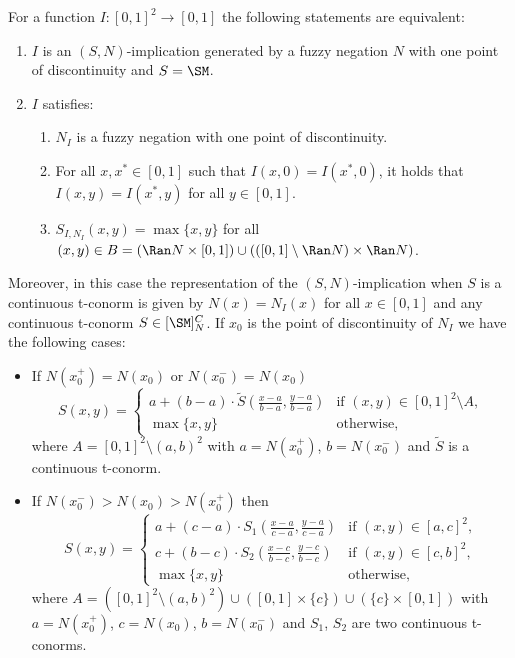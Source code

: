 \begin{proposition}\label{th:characterization(S,N)_maximum}
	For a function $I:[0,1]^2 \to [0,1]$ the following statements are equivalent:
	\begin{enumerate}[label=(\roman*)]
		\item $I$ is an $(S,N)$-implication  generated by a fuzzy negation $N$ with one point of discontinuity and $S=\SM$.
		\item $I$ satisfies:
		\begin{enumerate}
			\item $N_I$ is a fuzzy negation with one point of discontinuity.
			\item For all $x,x^*\in[0,1]$ such that $I(x,0)=I(x^*,0)$, it holds that $I(x,y)=I(x^*,y)$ for all $y\in[0,1]$.
			\item $S_{I,N_I}(x,y)=\max\{x,y\}$ for all $(x,y) \in B=(\Ran N \times [0,1]) \cup (([0,1] \setminus \Ran N) \times \Ran N)$.
		\end{enumerate}
	\end{enumerate}
	Moreover, in this case the representation of the $(S,N)$-implication when $S$ is a continuous t-conorm is given by $N(x)=N_I(x)$ for all $x \in [0,1]$ and any continuous t-conorm $S \in [\SM]_N^C$. If $x_0$ is the point of discontinuity of $N_I$ we have the following cases:
	\begin{itemize}
		\item If $N(x_0^+)=N(x_0)$ or $N(x_0^{-})=N(x_0)$ 
		$$
		S(x,y) =
		\left\{ \begin{array}{ll}
			a+(b-a)\cdot \tilde{S}\left(\frac{x-a}{b-a},\frac{y-a}{b-a}\right) &   \text{if }   (x,y) \in [0,1]^2 \setminus A, \\
			\max\{x,y\} & \text{otherwise,}
		\end{array} \right.
		$$
		where $A=[0,1]^2\setminus (a,b)^2$ with $a=N(x_0^+)$, $b=N(x_0^-)$ and $\tilde{S}$ is a continuous t-conorm.
		\item If $N(x_0^-)> N(x_0) > N(x_0^+)$ then
		$$
		S(x,y) =
		\left\{ \begin{array}{ll}
			a+(c-a)\cdot S_1\left(\frac{x-a}{c-a},\frac{y-a}{c-a}\right) &   \text{if }   (x,y) \in [a,c]^2, \\
			c+(b-c)\cdot S_2\left(\frac{x-c}{b-c},\frac{y-c}{b-c}\right) &   \text{if }   (x,y) \in [c,b]^2, \\
			\max\{x,y\} & \text{otherwise,}
		\end{array} \right.
		$$
		where  $A=([0,1]^2 \setminus (a,b)^2) \cup ([0,1]\times \{c\}) \cup (\{c\}\times [0,1])$ with $a=N(x_0^+)$, $c=N(x_0)$, $b=N(x_0^-)$ and $S_1$, $S_2$ are two continuous t-conorms.
	\end{itemize}
\end{proposition}

